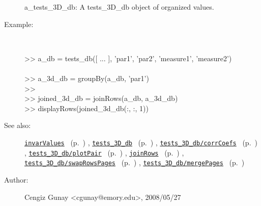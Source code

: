 \begin{description}
	a\_tests\_3D\_db: A tests\_3D\_db object of organized values.
%
\item[Example:]~
\begin{lyxcode} >> a\_db = tests\_db([ ... ], {'par1', 'par2', 'measure1', 'measure2'})
\\%
\\%
 >> a\_3d\_db = groupBy(a\_db, 'par1')
\\%
 >> %
\\%
 >> joined\_3d\_db = joinRows(a\_db, a\_3d\_db)
\\%
 >> displayRows(joined\_3d\_db(:, :, 1))
\\%
\end{lyxcode}
%
\item[See also:]%
\hyperlink{ref_invarValues}{\texttt{invarValues}}%
\ (p.~\pageref{ref_invarValues})%
%
, \hyperlink{ref_tests_3D_db}{\texttt{tests\_3D\_db}}%
\ (p.~\pageref{ref_tests_3D_db})%
%
, \hyperlink{ref_tests_3D_db__corrCoefs}{\texttt{tests\_3D\_db/corrCoefs}}%
\ (p.~\pageref{ref_tests_3D_db__corrCoefs})%
%
, \hyperlink{ref_tests_3D_db__plotPair}{\texttt{tests\_3D\_db/plotPair}}%
\ (p.~\pageref{ref_tests_3D_db__plotPair})%
%
, \hyperlink{ref_joinRows}{\texttt{joinRows}}%
\ (p.~\pageref{ref_joinRows})%
%
, \hyperlink{ref_tests_3D_db__swapRowsPages}{\texttt{tests\_3D\_db/swapRowsPages}}%
\ (p.~\pageref{ref_tests_3D_db__swapRowsPages})%
%
, \hyperlink{ref_tests_3D_db__mergePages}{\texttt{tests\_3D\_db/mergePages}}%
\ (p.~\pageref{ref_tests_3D_db__mergePages})%
%
%
\item[Author:]%
Cengiz Gunay <cgunay@emory.edu>, 2008/05/27
%
\end{description}
\methodline%
